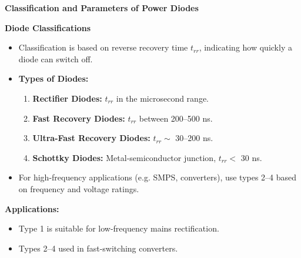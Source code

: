 \begin{frame}{\textbf{Classification and Parameters of Power Diodes}}

    \textbf{Diode Classifications}
    \begin{itemize}
        \item Classification is based on reverse recovery time $t_{rr}$, indicating how quickly a diode can switch off.
        \item \textbf{Types of Diodes:}
        \begin{enumerate}
            \item \textbf{Rectifier Diodes:} $t_{rr}$ in the microsecond range.
            \item \textbf{Fast Recovery Diodes:} $t_{rr}$ between 200--500 ns.
            \item \textbf{Ultra-Fast Recovery Diodes:} $t_{rr} \sim$ 30--200 ns.
            \item \textbf{Schottky Diodes:} Metal-semiconductor junction, $t_{rr} <$ 30 ns.
        \end{enumerate}
        \item For high-frequency applications (e.g. SMPS, converters), use types 2--4 based on frequency and voltage ratings.
    \end{itemize}
    
    \textbf{Applications:}
    \begin{itemize}
        \item Type 1 is suitable for low-frequency mains rectification.
        \item Types 2--4 used in fast-switching converters.
    \end{itemize}
    
    \end{frame}
    
